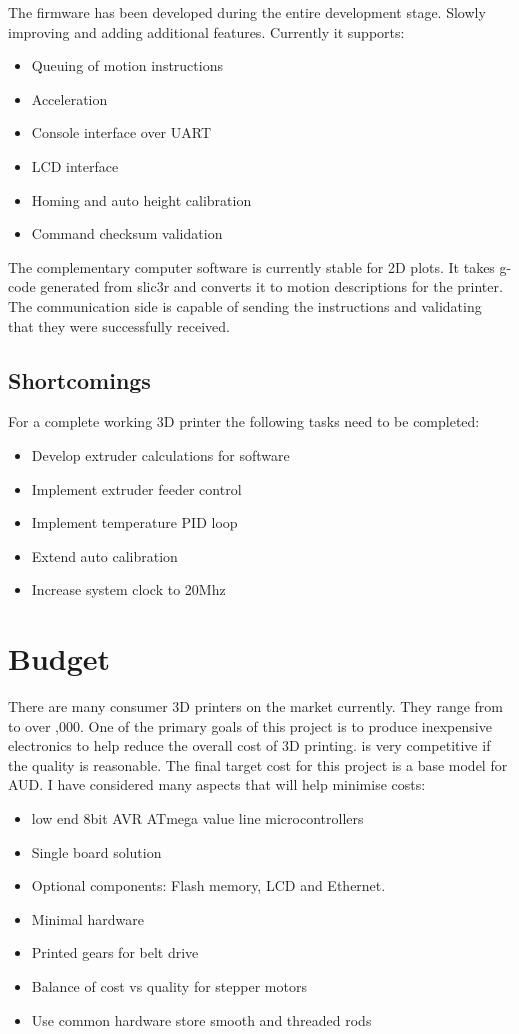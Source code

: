 \documentclass[a4paper, 11pt, twoside]{Thesis}  %
\begin{document}
The firmware has been developed during the entire development stage. Slowly improving and adding additional features. Currently it supports:
\begin{itemize}
\item  Queuing of motion instructions
\item  Acceleration
\item  Console interface over UART
\item  LCD interface
\item  Homing and auto height calibration
\item  Command checksum validation
\end{itemize}


The complementary computer software is currently stable for 2D plots. It takes g-code generated from slic3r and converts it to motion descriptions for the printer. The communication side is capable of sending the instructions and validating that they were successfully received.

\subsection{Shortcomings}
For a complete working 3D printer the following tasks need to be completed:

\begin{itemize}
\item  Develop extruder calculations for software
\item  Implement extruder feeder control
\item  Implement temperature PID loop
\item  Extend auto calibration
\item  Increase system clock to 20Mhz
\end{itemize}
\section{Budget}

There are many consumer 3D printers on the market currently. They range from  to over ,000. One of the primary goals of this project is to produce inexpensive electronics to help reduce the overall cost of 3D printing.  is very competitive if the quality is reasonable. The final target cost for this project is a base model for  AUD. I have considered many aspects that will help minimise costs:

\begin{itemize}
\item  low end 8bit AVR ATmega value line microcontrollers
\item  Single board solution
\item  Optional components: Flash memory, LCD and Ethernet.
\item  Minimal hardware
\item  Printed gears for belt drive
\item  Balance of cost vs quality for stepper motors
\item  Use common hardware store smooth and threaded rods
\end{itemize}
\end{document}
